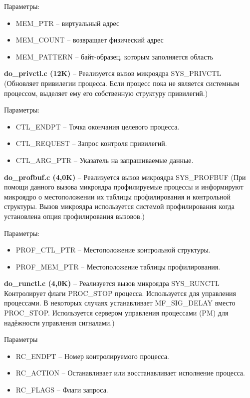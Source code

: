 Параметры:
\begin{itemize}
\item MEM\_PTR -- виртуальный адрес
\item MEM\_COUNT -- возвращает физический адрес
\item MEM\_PATTERN -- байт-образец, которым заполняется область
\end{itemize}

\textbf{do\_privctl.c (12K)} -- Реализуется вызов микроядра SYS\_PRIVCTL (Обновляет привилегии процесса. Если процесс пока не является системным процессом, выделяет ему его собственную структуру привилегий.)

Параметры:
\begin{itemize}
\item CTL\_ENDPT -- Точка окончания целевого процесса.
\item CTL\_REQUEST -- Запрос контроля привилегий.
\item CTL\_ARG\_PTR -- Указатель на запрашиваемые данные.
\end{itemize}

\textbf{do\_profbuf.c (4,0K)} -- Реализуется вызов микроядра SYS\_PROFBUF (При помощи данного вызова микроядра профилируемые процессы и информируют микроядро о местоположении их таблицы профилирования и контрольной структуры. Вызов микроядра используется системой профилирования когда установлена опция профилирования вызовов.)

Параметры:
\begin{itemize}
\item PROF\_CTL\_PTR -- Местоположение контрольной структуры.
\item PROF\_MEM\_PTR -- Местоположение таблицы профилирования.
\end{itemize}

\textbf{do\_runctl.c (4,0K)} -- Реализуется вызов микроядра SYS\_RUNCTL Контролирует флаги PROC\_STOP процесса. Используется для управления процессами. В некоторых случаях устанавливает MF\_SIG\_DELAY вместо PROC\_STOP. Используется сервером управления процессами (PM) для надёжности управления сигналами.)

Параметры
\begin{itemize}
\item RC\_ENDPT -- Номер контролируемого процесса.
\item RC\_ACTION -- Останавливает или восстанавливает исполнение процесса.
\item RC\_FLAGS -- Флаги запроса.
\end{itemize}

